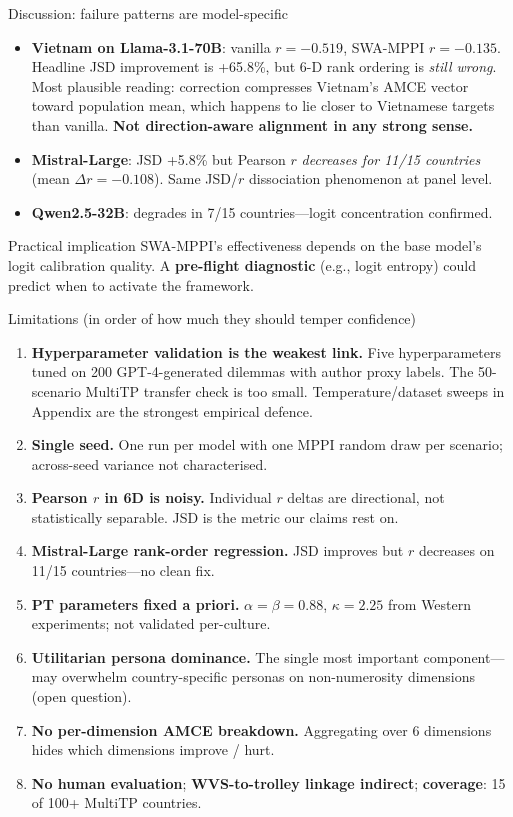 \documentclass[10pt,aspectratio=169]{beamer}
\begin{document}
\begin{frame}{Discussion: failure patterns are model-specific}
  \footnotesize
  \begin{itemize}
    \item \textbf{Vietnam on Llama-3.1-70B}: vanilla $r=-0.519$, SWA-MPPI $r=-0.135$. Headline JSD improvement is +65.8\%, but 6-D rank ordering is \emph{still wrong}. Most plausible reading: correction compresses Vietnam's AMCE vector toward population mean, which happens to lie closer to Vietnamese targets than vanilla. \textbf{Not direction-aware alignment in any strong sense.}
    \item \textbf{Mistral-Large}: JSD +5.8\% but Pearson $r$ \emph{decreases for 11/15 countries} (mean $\Delta r = -0.108$). Same JSD/$r$ dissociation phenomenon at panel level.
    \item \textbf{Qwen2.5-32B}: degrades in 7/15 countries—logit concentration confirmed.
  \end{itemize}
  \begin{block}{Practical implication}
    SWA-MPPI's effectiveness depends on the base model's logit calibration quality. A \textbf{pre-flight diagnostic} (e.g., logit entropy) could predict when to activate the framework.
  \end{block}
\end{frame}

\begin{frame}{Limitations (in order of how much they should temper confidence)}
  \footnotesize
  \begin{enumerate}
    \item \textbf{Hyperparameter validation is the weakest link.} Five hyperparameters tuned on 200 GPT-4-generated dilemmas with author proxy labels. The 50-scenario MultiTP transfer check is too small. Temperature/dataset sweeps in Appendix are the strongest empirical defence.
    \item \textbf{Single seed.} One run per model with one MPPI random draw per scenario; across-seed variance not characterised.
    \item \textbf{Pearson $r$ in 6D is noisy.} Individual $r$ deltas are directional, not statistically separable. JSD is the metric our claims rest on.
    \item \textbf{Mistral-Large rank-order regression.} JSD improves but $r$ decreases on 11/15 countries—no clean fix.
    \item \textbf{PT parameters fixed a priori.} $\alpha=\beta=0.88$, $\kappa=2.25$ from Western experiments; not validated per-culture.
    \item \textbf{Utilitarian persona dominance.} The single most important component—may overwhelm country-specific personas on non-numerosity dimensions (open question).
    \item \textbf{No per-dimension AMCE breakdown.} Aggregating over 6 dimensions hides which dimensions improve / hurt.
    \item \textbf{No human evaluation}; \textbf{WVS-to-trolley linkage indirect}; \textbf{coverage}: 15 of 100+ MultiTP countries.
  \end{enumerate}
\end{frame}
\end{document}
